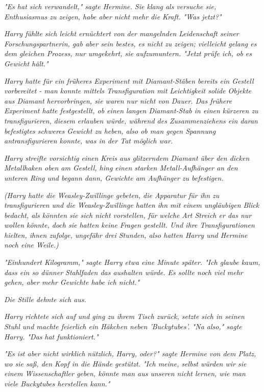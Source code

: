 {\emph{"Es hat sich verwandelt," sagte Hermine. Sie klang als versuche sie, Enthusiasmus zu zeigen, habe aber nicht mehr die Kraft. "Was jetzt?"}

\emph{Harry fühlte sich leicht ernüchtert von der mangelnden Leidenschaft seiner Forschungspartnerin, gab aber sein bestes, es nicht zu zeigen; vielleicht gelang es dem gleichen Prozess, nur umgekehrt, sie aufzumuntern. "Jetzt prüfe ich, ob es Gewicht hält."}

\emph{Harry hatte für ein früheres Experiment mit Diamant-Stäben bereits ein Gestell vorbereitet - man konnte mittels Transfiguration mit Leichtigkeit solide Objekte aus Diamant hervorbringen, sie waren nur nicht von Dauer. Das frühere Experiment hatte festgestellt, ob einen langen Diamant-Stab in einen kürzeren zu transfigurieren,} \emph{diesem} \emph{erlauben würde, während des Zusammenziehens ein daran befestigtes schweres Gewicht zu heben, also ob man gegen Spannung antransfigurieren konnte, was in der Tat möglich} \emph{war.}

\emph{Harry streifte vorsichtig einen Kreis aus glitzerndem Diamant über den dicken Metallhaken oben am Gestell, hing einen starken Metall-Aufhänger an den} \emph{unteren Ring und begann dann, Gewichte am Aufhänger zu befestigen.}

\emph{(Harry hatte die Weasley-Zwillinge gebeten, die Apparatur für ihn zu transfigurieren und die Weasley-Zwillinge hatten ihn mit einem ungläubigen Blick bedacht, als könnten sie sich nicht vorstellen, für} \emph{\emph{welche}} \emph{Art Streich er das nur wollen könnte, doch sie hatten keine Fragen gestellt. Und ihre Transfigurationen hielten, ihnen zufolge, ungefähr drei Stunden, also hatten Harry und Hermine noch eine Weile.)}

\emph{"Einhundert Kilogramm," sagte Harry etwa eine Minute später. "Ich glaube kaum, dass ein so dünner Stahlfaden das aushalten würde. Es sollte noch viel mehr gehen, aber mehr Gewichte habe ich nicht."}

\emph{Die Stille dehnte sich aus.}

\emph{Harry richtete sich auf und ging zu ihrem Tisch zurück, setzte sich in seinen Stuhl und machte feierlich ein Häkchen neben 'Buckytubes'. "Na also," sagte Harry. "\emph{Das}} \emph{hat funktioniert."}

\emph{"Es ist aber nicht wirklich} \emph{\emph{nützlich,}} \emph{Harry, oder?" sagte Hermine von dem Platz, wo sie saß, den Kopf in die Hände gestützt. "Ich meine, selbst würden wir sie einem Wissenschaftler geben, könnte man aus unseren nicht lernen, wie man viele Buckytubes herstellen kann."}

}
